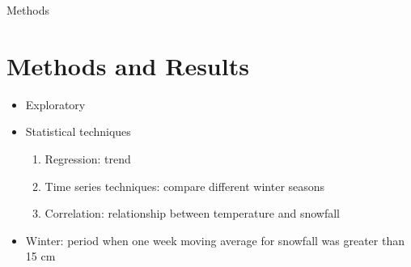 \documentclass{beamer}
\begin{document}
\begin{frame}{Methods}

\section{Methods and Results}

\begin{itemize}

\item Exploratory
\item Statistical techniques 
\begin{enumerate}
\item Regression: trend
\item Time series techniques: compare different winter seasons
\item Correlation: relationship between temperature and snowfall
\end{enumerate}

\item Winter: period when one week moving average for snowfall was greater than 15 cm 
\end{itemize}

\end{frame}
\end{document}
